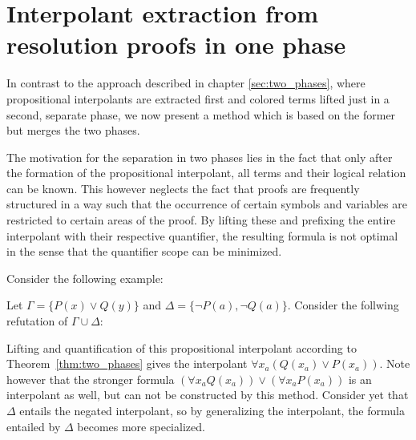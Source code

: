 \chapter{Interpolant extraction from resolution proofs in one phase}
\label{sec:one_phase}
\label{chap:one_phase}

In contrast to the approach described in chapter \ref{sec:two_phases}, where propositional interpolants are extracted first and colored terms lifted just in a second, separate phase, 
we now present a method which is based on the former but merges the two phases.

The motivation for the separation in two phases lies in the fact that only after the formation of the propositional interpolant, all terms and their logical relation can be known.
This however neglects the fact that proofs are frequently structured in a way such that the occurrence of certain symbols and variables are restricted to certain areas of the proof.
By lifting these and prefixing the entire interpolant with their respective quantifier, the resulting formula is not optimal in the sense that the quantifier scope can be minimized.

Consider the following example:

\begin{exa}
	\label{exa:one_phase_motivation}
	Let $\Gamma = \{ P(x) \lor Q(y) \}$ and $\Delta = \{\lnot P(a), \lnot Q(a)\}$.
	Consider the follwing refutation of $\Gamma \cup \Delta$:
	
	\begin{prooftree}
	\end{prooftree}

	Lifting and quantification of this propositional interpolant according to Theorem~\ref{thm:two_phases} gives the interpolant $\forall x_a (Q(x_a) \lor P(x_a))$.
	Note however that the stronger formula $(\forall x_a Q(x_a) ) \lor (\forall x_a P(x_a))$ is an interpolant as well, but can not be constructed by this method.
	Consider yet that $\Delta$ entails the negated interpolant, so by generalizing the interpolant, the formula entailed by $\Delta$ becomes more specialized.
\end{exa}


